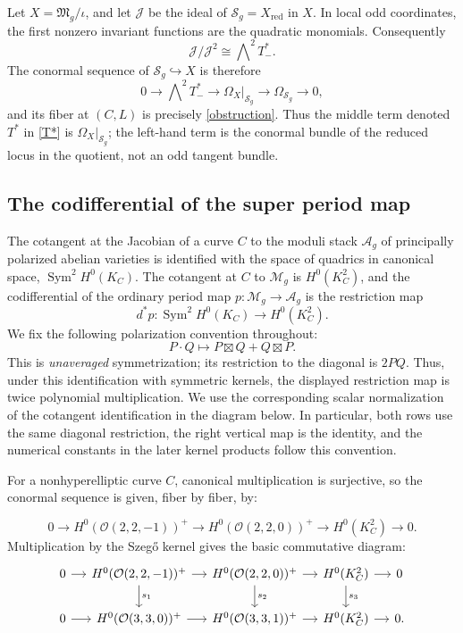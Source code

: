 \documentclass[10pt,a4paper]{amsart}
\newcommand{\OO}{\mathcal O}
\newcommand{\MM}{\mathcal M}
\newcommand{\FM}{\mathfrak M}
\newcommand{\Aa}{\mathcal A}
\newcommand{\SSS}{\mathcal S}
\newcommand{\Sym}{\operatorname{Sym}}
\begin{document}
Let $X=\FM_g/\iota$, and let $\mathcal J$ be the ideal of
$\SSS_g=X_{\mathrm{red}}$ in $X$.  In {local odd coordinates,}
the first nonzero invariant functions are the quadratic monomials.
Consequently
\[
\mathcal J/\mathcal J^2\cong\bigwedge\nolimits^2T_-^*.
\]
The conormal sequence of $\SSS_g\hookrightarrow X$ is therefore
\[
0\longrightarrow\bigwedge\nolimits^2T_-^*
\longrightarrow\Omega_X\big|_{\SSS_g}
\longrightarrow\Omega_{\SSS_g}\longrightarrow0,
\]
and its fiber at $(C,L)$ is precisely \eqref{obstruction}.  Thus the
middle term denoted $T^*$ in \eqref{T*} is
$\Omega_X|_{\SSS_g}$; the left-hand term is the conormal bundle of the
reduced locus in the quotient, not an odd tangent bundle.


\subsection{The codifferential of the super period map}


The cotangent at the Jacobian of a curve $C$ to
the moduli stack $\Aa_g$ of principally polarized abelian varieties
is identified with the space of quadrics in canonical space, $\Sym^2 H^0(K_C)$.
The cotangent at $C$ to $\MM_g$ is $H^0(K_C^2)$, and the codifferential of the
ordinary period map $p:\MM_g\to \Aa_g$ is the restriction map
\[
d^*p: \Sym^2 H^0(K_C) \to H^0(K_C^2).
\]
\begingroup
We fix the following polarization convention throughout:
\[
P\cdot Q\longmapsto P\boxtimes Q+Q\boxtimes P.
\]
This is \emph{unaveraged} symmetrization; its restriction to the diagonal
is $2PQ$. Thus, under this identification with symmetric kernels, the
displayed restriction map is twice polynomial multiplication. We use
the corresponding scalar normalization of the cotangent identification
in the diagram below. In particular, both rows use the same diagonal
restriction, the right vertical map is the identity, and the numerical
constants in the later kernel products follow this convention.

For a nonhyperelliptic curve $C$, canonical multiplication is surjective,
so the conormal sequence is given, fiber by fiber, by:
\endgroup

\begin{equation}
0\to {H^0(\OO(2,2,-1))^+} \to {H^0(\OO(2,2,0))^+} \to H^0(K_C^2)\to 0.
\end{equation}
Multiplication by the Szeg\H{o} kernel gives the basic commutative diagram:
\begin{equation}
    \begin{tikzcd}[column sep=small]
0 \arrow[r] &
{H^0(\OO(2,2,-1))^+} \arrow[r] \arrow[d,"s_1"] &
{H^0(\OO(2,2,0))^+} \arrow[r] \arrow[d,"s_2"] &
H^0(K_C^2) \arrow[r] \arrow[d,"s_3"] &
0 \\
0 \arrow[r] &
{H^0(\OO(3,3,0))^+} \arrow[r] &
{H^0(\OO(3,3,1))^+} \arrow[r] &
H^0(K_C^2) \arrow[r] &
0.
\end{tikzcd}
\end{equation}
\end{document}
